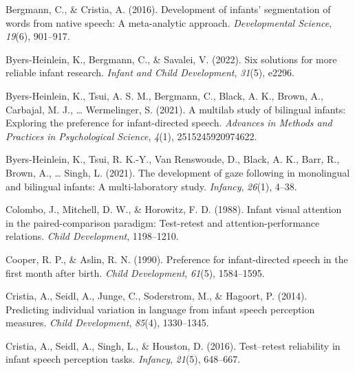 \documentclass[
  man,floatsintext]{apa6}
\newlength{\cslhangindent}
\newlength{\cslentryspacingunit} %
\newenvironment{CSLReferences}[2] %
 {%
  \setlength{\parindent}{0pt}
  \ifodd #1
  \let\oldpar\par
  \def\par{\hangindent=\cslhangindent\oldpar}
  \fi
  \setlength{\parskip}{#2\cslentryspacingunit}
 }%
 {}
\begin{document}
\begingroup
\setlength{\parindent}{-0.5in}
\setlength{\leftskip}{0.5in}

\hypertarget{refs}{}
\begin{CSLReferences}{1}{0}
\leavevmode{}%
Bergmann, C., \& Cristia, A. (2016). Development of infants' segmentation of words from native speech: A meta-analytic approach. \emph{Developmental Science}, \emph{19}(6), 901--917.

\leavevmode{}%
Byers-Heinlein, K., Bergmann, C., \& Savalei, V. (2022). Six solutions for more reliable infant research. \emph{Infant and Child Development}, \emph{31}(5), e2296.

\leavevmode{}%
Byers-Heinlein, K., Tsui, A. S. M., Bergmann, C., Black, A. K., Brown, A., Carbajal, M. J., \ldots{} Wermelinger, S. (2021). A multilab study of bilingual infants: Exploring the preference for infant-directed speech. \emph{Advances in Methods and Practices in Psychological Science}, \emph{4}(1), 2515245920974622.

\leavevmode{}%
Byers-Heinlein, K., Tsui, R. K.-Y., Van Renswoude, D., Black, A. K., Barr, R., Brown, A., \ldots{} Singh, L. (2021). The development of gaze following in monolingual and bilingual infants: A multi-laboratory study. \emph{Infancy}, \emph{26}(1), 4--38.

\leavevmode{}%
Colombo, J., Mitchell, D. W., \& Horowitz, F. D. (1988). Infant visual attention in the paired-comparison paradigm: Test-retest and attention-performance relations. \emph{Child Development}, 1198--1210.

\leavevmode{}%
Cooper, R. P., \& Aslin, R. N. (1990). Preference for infant-directed speech in the first month after birth. \emph{Child Development}, \emph{61}(5), 1584--1595.

\leavevmode{}%
Cristia, A., Seidl, A., Junge, C., Soderstrom, M., \& Hagoort, P. (2014). Predicting individual variation in language from infant speech perception measures. \emph{Child Development}, \emph{85}(4), 1330--1345.

\leavevmode{}%
Cristia, A., Seidl, A., Singh, L., \& Houston, D. (2016). Test--retest reliability in infant speech perception tasks. \emph{Infancy}, \emph{21}(5), 648--667.


\end{CSLReferences}
\end{document}
